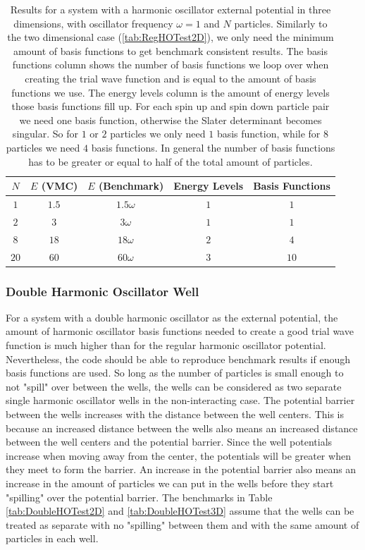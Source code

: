 \documentclass[../main.tex]{subfiles}
\begin{document}
\begin{table}[!ht]
  \centering
  \begin{tabular}{ | c | c | c | c | c | }
    \hline
    $N$ & $E$ (VMC) & $E$ (Benchmark) &  Energy Levels & Basis Functions\\*
    \hline
    $1$ & $1.5$ & $1.5\omega$ & $1$ & $1$ \\*
    \hline
    $2$ & $3$ & $3\omega$ & $1$ & $1$ \\*
    \hline
    $8$ & $18$ & $18\omega$ & $2$ & $4$ \\*
    \hline
    $20$ & $60$ & $60\omega$ & $3$ & $10$ \\*
    \hline
  \end{tabular}
  \caption{Results for a system with a harmonic oscillator external potential in three dimensions, with oscillator frequency $\omega = 1$ and $N$ particles. Similarly to the two dimensional case (\ref{tab:RegHOTest2D}), we only need the minimum amount of basis functions to get benchmark consistent results. The basis functions column shows the number of basis functions we loop over when creating the trial wave function and is equal to the amount of basis functions we use. The energy levels column is the amount of energy levels those basis functions fill up. For each spin up and spin down particle pair we need one basis function, otherwise the Slater determinant becomes singular. So for $1$ or $2$ particles we only need $1$ basis function, while for $8$ particles we need $4$ basis functions. In general the number of basis functions has to be greater or equal to half of the total amount of particles.}
  \label{tab:RegHOTest3D}
\end{table}

\subsubsection{Double Harmonic Oscillator Well}

For a system with a double harmonic oscillator as the external potential, the amount of harmonic oscillator basis functions needed to create a good trial wave function is much higher than for the regular harmonic oscillator potential. Nevertheless, the code should be able to reproduce benchmark results if enough basis functions are used. So long as the number of particles is small enough to not "spill" over between the wells, the wells can be considered as two separate single harmonic oscillator wells in the non-interacting case. The potential barrier between the wells increases with the distance between the well centers. This is because an increased distance between the wells also means an increased distance between the well centers and the potential barrier. Since the well potentials increase when moving away from the center, the potentials will be greater when they meet to form the barrier. An increase in the potential barrier also means an increase in the amount of particles we can put in the wells before they start "spilling" over the potential barrier. The benchmarks in Table \ref{tab:DoubleHOTest2D} and \ref{tab:DoubleHOTest3D} assume that the wells can be treated as separate with no "spilling" between them and with the same amount of particles in each well. 
\end{document}
